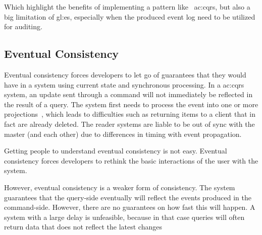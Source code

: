 Which highlight the benefits of implementing a pattern like ~\gls{ac:cqrs}, but also a big limitation of \gls{gl:es}, especially when the produced event log need to be utilized for auditing.

\subsection{Eventual Consistency}

Eventual consistency forces developers to let go of guarantees that they would have in a system using current state and synchronous processing. In a \gls{ac:cqrs} system, an update sent through a command will not immediately be reflected in the result of a query. The system first needs to process the event into one or more projections~\citep{OVEREEM2021110970}, which leads to difficulties such as returning items to a client that in fact are already deleted. The reader systems are liable to be out of sync with the master (and each other) due to differences in timing with event propagation.

Getting people to understand eventual consistency is not easy. Eventual consistency forces developers to rethink the basic interactions of the user with the system. 

However, eventual consistency is a weaker form of consistency. The system guarantees that the query-side eventually will reflect the events produced in the command-side. However, there are no guarantees on how fast this will happen. A system with a large delay is unfeasible, because in that case queries will often return data that does not reflect the latest changes


